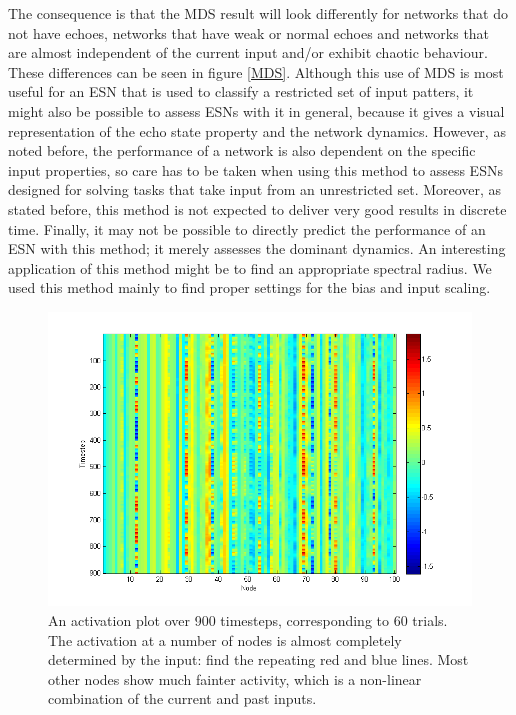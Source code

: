 \documentclass[10pt,a4paper]{report}
\begin{document}
The consequence is that the MDS result will look differently for networks that do not have echoes, networks that have weak or normal echoes and networks that are almost independent of the current input and/or exhibit chaotic behaviour. These differences can be seen in figure \ref{MDS}. Although this use of MDS is most useful for an ESN that is used to classify a restricted set of input patters, it might also be possible to assess ESNs with it in general, because it gives a visual representation of the echo state property and the network dynamics. However, as noted before, the performance of a network is also dependent on the specific input properties, so care has to be taken when using this method to assess ESNs designed for solving tasks that take input from an unrestricted set. Moreover, as stated before, this method is not expected to deliver very good results in discrete time. Finally, it may not be possible to directly predict the performance of an ESN with this method; it merely assesses the dominant dynamics. An interesting application of this method might be to find an appropriate spectral radius. We used this method mainly to find proper settings for the bias and input scaling.

\begin{figure}[bthp]
\begin{center}
\includegraphics[width=\textwidth]{figures/activations.png}
\caption{An activation plot over 900 timesteps, corresponding to 60 trials. The activation at a number of nodes is almost completely determined by the input: find the repeating red and blue lines. Most other nodes show much fainter activity, which is a non-linear combination of the current and past inputs. }
\label{activations}
\end{center} 
\end{figure}
\end{document}
